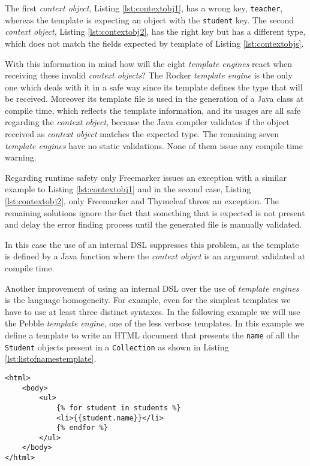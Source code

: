 \noindent
The first \textit{context object}, Listing \ref{lst:contextobj1}, has a wrong key, \texttt{teacher}, whereas the template is expecting an object with the \texttt{student} key. The second \textit{context object}, Listing \ref{lst:contextobj2}, has the right key but has a different type, which does not match the fields expected by template of Listing \ref{lst:contextobjs}.

\noindent
With this information in mind how will the eight \textit{template engines} react when receiving these invalid \textit{context objects}? The Rocker \textit{template engine} is the only one which deals with it in a safe way since its template defines the type that will be received. Moreover its template file is used in the generation of a Java class at compile time, which reflects the template information, and its usages are all safe regarding the \textit{context object}, because the Java compiler validates if the object received as \textit{context object} matches the expected type. The remaining seven \textit{template engines} have no static validations. None of them issue any compile time warning. 

\noindent
Regarding runtime safety only Freemarker issues an exception with a similar example to Listing \ref{lst:contextobj1} and in the second case, Listing \ref{lst:contextobj2}, only Freemarker and Thymeleaf throw an exception. The remaining solutions ignore the fact that something that is expected is not present and delay the error finding process until the generated file is manually validated. 

\noindent
In this case the use of an internal \ac{DSL} suppresses this problem, as the template is defined by a Java function where the \textit{context object} is an argument validated at compile time.

\noindent
Another improvement of using an internal \ac{DSL} over the use of \textit{template engines} is the language homogeneity. For example, even for the simplest templates we have to use at least three distinct syntaxes. In the following example we will use the Pebble \textit{template engine}, one of the less verbose templates. In this example we define a template to write an \ac{HTML} document that presents the \texttt{name} of all the \texttt{Student} objects present in a \texttt{Collection} as shown in Listing \ref{lst:listofnamestemplate}.

\bigskip

\lstset{language=html}

\begin{minipage}{\linewidth}
\begin{lstlisting}[caption={List of Student Names - Template Definition using Pebble}, label={lst:listofnamestemplate}]
<html>
	<body>
	    <ul>
			{% for student in students %}
		  	<li>{{student.name}}</li>
			{% endfor %}
		</ul>  
  	</body>
</html>
\end{lstlisting}
\end{minipage} 

